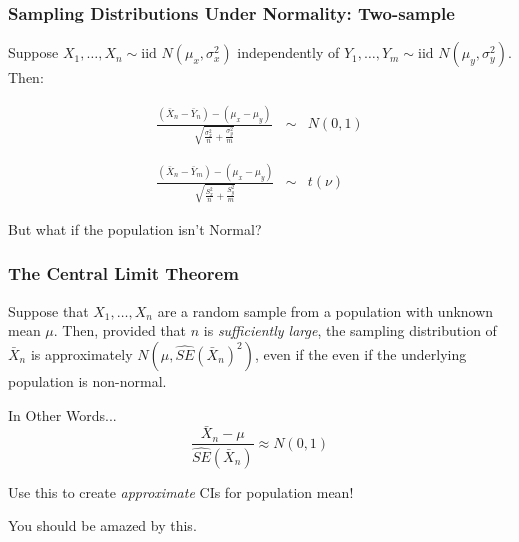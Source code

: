 \documentclass{beamer}
\begin{document}
\begin{frame}
\frametitle{Sampling Distributions Under Normality: Two-sample}
Suppose $X_1, \hdots, X_{n} \sim \mbox{iid } N(\mu_x, \sigma^2_x)$ independently of $Y_1, \hdots, Y_{m} \sim \mbox{iid } N(\mu_y, \sigma^2_y)$. Then:


	\begin{eqnarray*}
\frac{(\bar{X}_n - \bar{Y}_n) - (\mu_x -\mu_y)}{\sqrt{\displaystyle\frac{\sigma_x^2}{n} + \frac{\sigma_y^2}{m} }} &\sim& N(0,1) \\ \\ \\
		\frac{\left(\bar{X}_n - \bar{Y}_m\right) - (\mu_x - \mu_y)}{\sqrt{\displaystyle\frac{S_x^2}{n} + \frac{S_y^2}{m} }}&\sim& t(\nu)
	\end{eqnarray*}
\end{frame}

\begin{frame}
\begin{center}\Huge But what if the population isn't Normal?\end{center}
\end{frame}

\begin{frame}
\frametitle{The Central Limit Theorem}
Suppose that $X_1, \hdots, X_n$ are a random sample from a population with unknown mean $\mu$. Then, provided that $n$ is \alert{\emph{sufficiently large}}, the sampling distribution of $\bar{X}_n$ is approximately $N\left(\mu, \widehat{SE}(\bar{X}_n)^2\right)$, even if the even if the underlying population is \alert{non-normal}.

\begin{block}{In Other Words...}
	$$\frac{\bar{X}_n -\mu}{\widehat{SE}(\bar{X}_n)} \approx N(0,1)$$
\end{block}

\begin{alertblock}{Use this to create \emph{approximate} CIs for population mean!}
\end{alertblock}
\end{frame}

\begin{frame}
\begin{center}\Huge You should be amazed by this.\end{center}
\end{frame}
\end{document}
